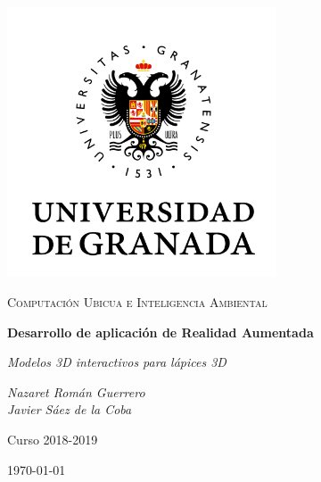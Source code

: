 \documentclass[12pt,a4paper]{article}
\begin{document}
\begin{titlepage}
  \centering
  \includegraphics[width=0.6\textwidth]{ugr.png}\par\vspace{1cm}
  {\scshape\large Computación Ubicua e Inteligencia Ambiental \par} \vspace{1cm}
  {\huge\bfseries Desarrollo de aplicación de Realidad Aumentada \par}
  \vspace{0.4cm}
  {\large\itshape Modelos 3D interactivos para lápices 3D\\}
  \vspace{0.6cm}
  {\large\itshape  Nazaret Román Guerrero \\ Javier Sáez de la Coba  \par} \vspace{1.00cm}
  Curso 2018-2019 \\
  \vfill

  {\large \today\par}
\end{titlepage}

\tableofcontents
\newpage

\setlength{\parskip}{10pt}
\end{document}
